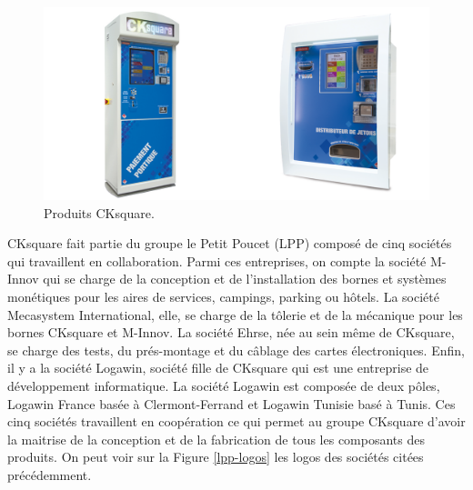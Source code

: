 \documentclass[a4paper]{article}
\begin{document}
\begin{figure}[h!]
  \begin{center}
  \includegraphics[scale=0.2]{./img/bornes.png}
  \caption{Produits CKsquare.}
    \label{bornes-intro}
  \end{center}
\end{figure}

CKsquare fait partie du groupe le Petit Poucet (LPP) composé de cinq sociétés
qui travaillent en collaboration. Parmi ces entreprises, on compte la société
M-Innov qui se charge de la conception et de l'installation des bornes et
systèmes monétiques pour les aires de services, campings, parking ou hôtels. La
société Mecasystem International, elle, se charge de la tôlerie et de la
mécanique pour les bornes CKsquare et M-Innov. La société Ehrse, née au sein
même de CKsquare, se charge des tests, du prés-montage et du câblage des cartes
électroniques. Enfin, il y a la société Logawin, société fille de CKsquare qui
est une entreprise de développement informatique. La société Logawin est
composée de deux pôles, Logawin France basée à Clermont-Ferrand et Logawin
Tunisie basé à Tunis. Ces cinq sociétés travaillent en coopération ce qui permet
au groupe CKsquare d'avoir la maitrise de la conception et de la fabrication de
tous les composants des produits. On peut voir sur la Figure \ref{lpp-logos} les
logos des sociétés citées précédemment.

\clearpage
\end{document}
